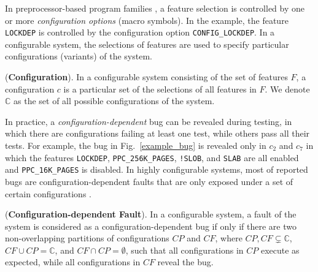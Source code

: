 %
In preprocessor-based program families \cite{kastner2012virtual}, a 
feature selection is controlled by one or more \textit{configuration 
options} (macro symbols). In the example, the feature \texttt{LOCKDEP} 
is controlled by the configuration option \texttt{CONFIG\_LOCKDEP}.
%
In a configurable system, the selections of features are used to specify
particular configurations (variants) of the system.
%
\begin{Definition}{({\bf Configuration}).}
In a configurable system consisting of the set of features $F$, a 
configuration $c$ is a particular set of the selections of all 
features in $F$. We denote $\mathbb{C}$ as the set of all possible 
configurations of the system.
\end{Definition}

%

In practice, a {\em configuration-dependent} bug can be revealed
during testing, in which there are configurations failing at least
one test, while others pass all their tests.
%
%
%
For example, the bug in Fig.~\ref{example_bug} is revealed only in
$c_2$ and $c_7$ in which the features \texttt{LOCKDEP},
\texttt{PPC\_256K\_PAGES}, \texttt{!SLOB}, and \texttt{SLAB} are all
enabled and \texttt{PPC\_16K\_PAGES} is disabled.
%
In highly configurable systems, most of reported bugs  are 
configuration-dependent faults that are only exposed under a set of 
certain configurations \cite{Abal:2018} \cite{Garvin:2011}. 

%

\begin{Definition}{({\bf Configuration-dependent Fault}).}
In a configurable system, a fault of the system is considered as a
configuration-dependent bug if only if there are two non-overlapping
partitions of configurations $CP$ and $CF$, where $CP, CF \subsetneq
\mathbb{C}$, $CF \cup CP = \mathbb{C}$, and $CF \cap CP = \emptyset$,
such that all configurations in $CP$ execute as expected, while all
configurations in $CF$ reveal the bug.
\end{Definition}

